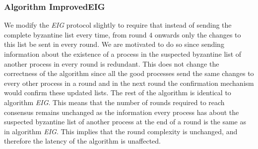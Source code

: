 \subsubsection{Algorithm ImprovedEIG}
\label{sec:modEIG}
        We modify the \textit{EIG} protocol slightly to require that
        instead of sending the complete byzantine list every time, from round
        $4$ onwards only the changes to this list be sent in every round. We
        are motivated to do so since sending information about the existence of
        a process in the suspected byzantine list of another process in every
        round is redundant. This does not change the correctness of the
        algorithm since all the good processes send the same changes to every
        other process in a round and in the next round the confirmation
        mechanism would confirm these updated lists.  The rest of the algorithm
        is identical to algorithm \textit{EIG}.  This means that the number of
        rounds required to reach consensus remains unchanged as the information
        every process has about the suspected byzantine list of another process
        at the end of a round is the same as in algorithm \textit{EIG}. This
        implies that the round complexity is unchanged, and therefore the
        latency of the algorithm is unaffected.

